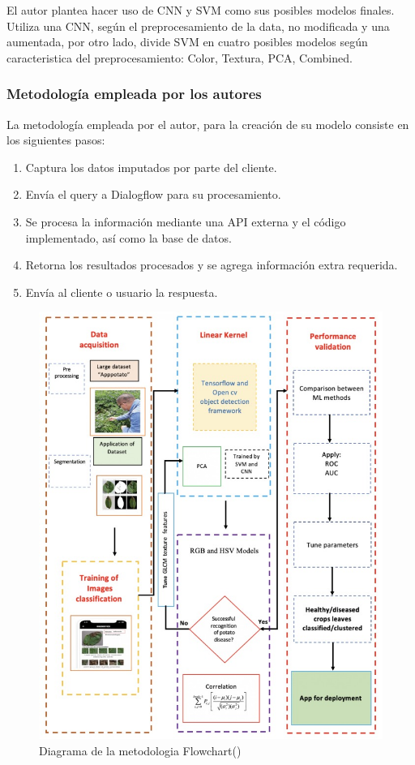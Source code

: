 El autor plantea hacer uso de CNN y SVM como sus posibles modelos finales. Utiliza una CNN, según el preprocesamiento de la data, no modificada y una aumentada, por otro lado, divide SVM en cuatro posibles modelos según caracteristica del preprocesamiento: Color, Textura, PCA, Combined. 

\subsubsection{Metodología empleada por los autores}
La metodología empleada por el autor, para la creación de su modelo consiste en los siguientes pasos: 

\begin{enumerate}
	\item Captura los datos imputados por parte del cliente.
	\item Envía el query a Dialogflow para su procesamiento.
	\item Se procesa la información mediante una API externa y el código implementado, así como la base de datos.
	\item Retorna los resultados procesados y se agrega información extra requerida.
	\item Envía al cliente o usuario la respuesta.
\end{enumerate}

\begin{figure}[H]
	\begin{center}
		\includegraphics[width=1\textwidth]{2/figures/ant3.jpeg}
		\caption{Diagrama de la metodologia Flowchart(\cite{antecedente3})}
	\end{center}
\end{figure}

